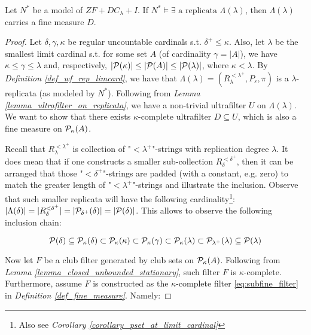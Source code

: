 \begin{theorem}\label{theorem_fine_measure_on_replicata}
    Let $N^\ast$ be a model of $ZF+DC_\lambda+I$. If $N^\ast \models \exists \text{ a replicata }\Lambda(\lambda)$, then $\Lambda(\lambda)$ carries a fine measure $D$.
\end{theorem}
\begin{proof}
    Let $\delta, \gamma, \kappa$ be regular uncountable cardinals s.t. $\delta^+ \leq \kappa$. Also, let $\lambda$ be the smallest limit cardinal s.t. for some set $A$ (of cardinality $\gamma = |A|$), we have $\kappa \leq \gamma \leq \lambda$ and, respectively, $|\mathcal{P}(\kappa)| \leq |\mathcal{P}(A)| \leq |\mathcal{P}(\lambda)|$, where $\kappa < \lambda$. By \textit{Definition \ref{def_wf_rep_limcard}}, we have that $\Lambda(\lambda) = (R^{<\lambda^+}_\lambda, P_{\varepsilon}, \pi)$ is a $\lambda$-replicata (as modeled by $N^\ast$). Following from \textit{Lemma \ref{lemma_ultrafilter_on_replicata}}, we have a non-trivial ultrafilter $U$ on $\Lambda(\lambda)$. We want to show that there exists $\kappa$-complete ultrafilter $D \subseteq U$, which is also a fine measure on $\mathcal{P}_\kappa(A)$.

    Recall that $R^{<\lambda^+}_\lambda$ is collection of "$<\lambda^+$"-strings with replication degree $\lambda$. It does mean that if one constructs a smaller sub-collection $R^{<\delta^+}_\delta$, then it can be arranged that those "$<\delta^+$"-strings are padded (with a constant, e.g. zero) to match the greater length of "$<\lambda^+$"-strings and illustrate the inclusion. Observe that such smaller replicata will have the following cardinality\footnote{Also see \textit{Corollary \ref{corollary_pset_at_limit_cardinal}}}: $|\Lambda(\delta)| = |R^{<\delta^+}_\delta| = |\mathcal{P}_{\delta^+}(\delta)| = |\mathcal{P}(\delta)|$. This allows to observe the following inclusion chain: 
    
    \begin{equation}\label{eq:pset_inc_chain}
        \mathcal{P}(\delta) \subseteq \mathcal{P}_\kappa(\delta) \subset \mathcal{P}_\kappa(\kappa) \subset \mathcal{P}_\kappa(\gamma) \subset \mathcal{P}_\kappa(\lambda) \subset \mathcal{P}_{\lambda^+}(\lambda) \subseteq \mathcal{P}(\lambda)
    \end{equation}

    Now let $F$ be a club filter generated by club sets on $\mathcal{P}_\kappa(A)$. Following from \textit{Lemma \ref{lemma_closed_unbounded_stationary}}, such filter $F$ is $\kappa$-complete. Furthermore, assume $F$ is constructed as the \( \kappa \)-complete filter \eqref{eq:subfine_filter} in \textit{Definition \ref{def_fine_measure}}. Namely:


\end{proof}
